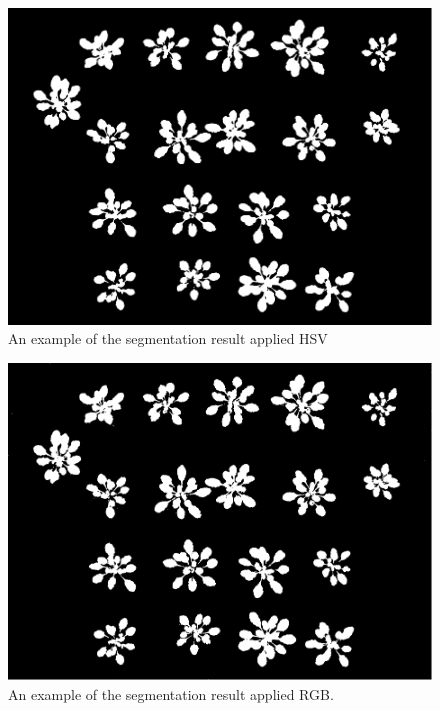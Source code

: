 \documentclass[conference]{IEEEtran}
\begin{document}
\begin{figure}[htbp]
\centerline{\includegraphics[scale=0.37]{T22.png}}
\caption{An example of the segmentation result applied HSV}
\label{fig3}
\end{figure}
\begin{figure}[htbp]
\centerline{\includegraphics[scale=0.35]{T23.png}}
\caption{An example of the segmentation result applied RGB.}
\label{fig4}
\end{figure}
\end{document}
